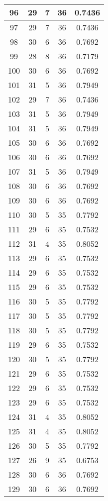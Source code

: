 \documentclass[letterpaper, 12pt]{article}
\begin{document}
\begin{longtable}{|c|c|c|c|c|}
\hline
96 & 29 & 7 & 36 & 0.7436 \\
\hline
97 & 29 & 7 & 36 & 0.7436 \\
\hline
98 & 30 & 6 & 36 & 0.7692 \\
\hline
99 & 28 & 8 & 36 & 0.7179 \\
\hline
100 & 30 & 6 & 36 & 0.7692 \\
\hline
101 & 31 & 5 & 36 & 0.7949 \\
\hline
102 & 29 & 7 & 36 & 0.7436 \\
\hline
103 & 31 & 5 & 36 & 0.7949 \\
\hline
104 & 31 & 5 & 36 & 0.7949 \\
\hline
105 & 30 & 6 & 36 & 0.7692 \\
\hline
106 & 30 & 6 & 36 & 0.7692 \\
\hline
107 & 31 & 5 & 36 & 0.7949 \\
\hline
108 & 30 & 6 & 36 & 0.7692 \\
\hline
109 & 30 & 6 & 36 & 0.7692 \\
\hline
110 & 30 & 5 & 35 & 0.7792 \\
\hline
111 & 29 & 6 & 35 & 0.7532 \\
\hline
112 & 31 & 4 & 35 & 0.8052 \\
\hline
113 & 29 & 6 & 35 & 0.7532 \\
\hline
114 & 29 & 6 & 35 & 0.7532 \\
\hline
115 & 29 & 6 & 35 & 0.7532 \\
\hline
116 & 30 & 5 & 35 & 0.7792 \\
\hline
117 & 30 & 5 & 35 & 0.7792 \\
\hline
118 & 30 & 5 & 35 & 0.7792 \\
\hline
119 & 29 & 6 & 35 & 0.7532 \\
\hline
120 & 30 & 5 & 35 & 0.7792 \\
\hline
121 & 29 & 6 & 35 & 0.7532 \\
\hline
122 & 29 & 6 & 35 & 0.7532 \\
\hline
123 & 29 & 6 & 35 & 0.7532 \\
\hline
124 & 31 & 4 & 35 & 0.8052 \\
\hline
125 & 31 & 4 & 35 & 0.8052 \\
\hline
126 & 30 & 5 & 35 & 0.7792 \\
\hline
127 & 26 & 9 & 35 & 0.6753 \\
\hline
128 & 30 & 6 & 36 & 0.7692 \\
\hline
129 & 30 & 6 & 36 & 0.7692 \\

\end{longtable}
\end{document}
